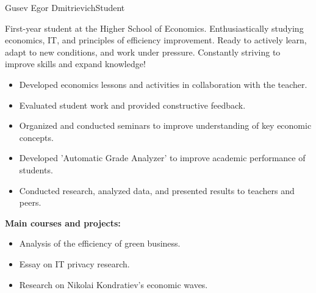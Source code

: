 \documentclass{article}
\begin{document}
\begin{cv}[avatar]{Gusev Egor Dmitrievich}{Student}

First-year student at the Higher School of Economics. 
Enthusiastically studying economics, IT, and principles of efficiency improvement. Ready to actively learn, adapt to new conditions, and work under pressure. Constantly striving to improve skills and expand knowledge!


\begin{cvevent}[2022][2021]
    \begin{itemize}
        \item Developed economics lessons and activities in collaboration with the teacher.
        \item Evaluated student work and provided constructive feedback.
        \item Organized and conducted seminars to improve understanding of key economic concepts.
    \end{itemize}
\end{cvevent}

\begin{cvevent}[2022][2022]
    \begin{itemize}
        \item Developed 'Automatic Grade Analyzer' to improve academic performance of students.
        \item Conducted research, analyzed data, and presented results to teachers and peers.
    \end{itemize}
\end{cvevent}


\begin{cvevent}[2022][2020]
    \textbf{Main courses and projects:}
    \begin{itemize}
        \item Analysis of the efficiency of green business.
        \item Essay on IT privacy research.
        \item Research on Nikolai Kondratiev's economic waves.
    \end{itemize}
\end{cvevent}


\end{cv}
\end{document}
